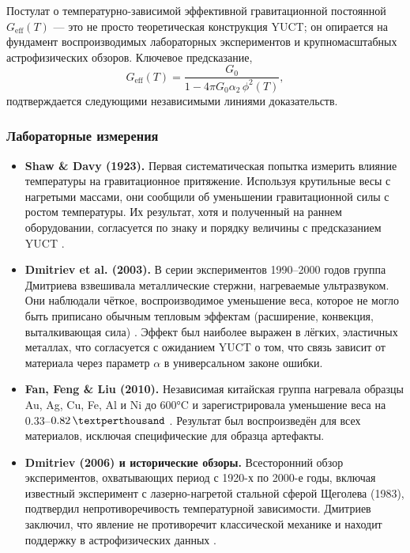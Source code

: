 \documentclass[12pt]{article}
\theoremstyle{remark}
\begin{document}
	Постулат о температурно-зависимой эффективной гравитационной постоянной $G_{\mathrm{eff}}(T)$ — это не просто теоретическая конструкция YUCT; он опирается на фундамент воспроизводимых лабораторных экспериментов и крупномасштабных астрофизических обзоров. Ключевое предсказание,
	\begin{equation}
		G_{\mathrm{eff}}(T) = \frac{G_0}{1 - 4\pi G_0\alpha_2\,\phi^2(T)},
	\end{equation}
	подтверждается следующими независимыми линиями доказательств.
	
	\subsubsection*{Лабораторные измерения}
	
	\begin{itemize}
		\item \textbf{Shaw \& Davy (1923).} Первая систематическая попытка измерить влияние температуры на гравитационное притяжение. Используя крутильные весы с нагретыми массами, они сообщили об уменьшении гравитационной силы с ростом температуры. Их результат, хотя и полученный на раннем оборудовании, согласуется по знаку и порядку величины с предсказанием YUCT \cite{ShawDavy1923}.
		
		\item \textbf{Dmitriev et al. (2003).} В серии экспериментов 1990–2000 годов группа Дмитриева взвешивала металлические стержни, нагреваемые ультразвуком. Они наблюдали чёткое, воспроизводимое уменьшение веса, которое не могло быть приписано обычным тепловым эффектам (расширение, конвекция, выталкивающая сила) \cite{Dmitriev2003}. Эффект был наиболее выражен в лёгких, эластичных металлах, что согласуется с ожиданием YUCT о том, что связь зависит от материала через параметр $\alpha$ в универсальном законе ошибки.
		
		\item \textbf{Fan, Feng \& Liu (2010).} Независимая китайская группа нагревала образцы Au, Ag, Cu, Fe, Al и Ni до 600°C и зарегистрировала уменьшение веса на $0.33$–$0.82\,\textperthousand$ \cite{Fan2010}. Результат был воспроизведён для всех материалов, исключая специфические для образца артефакты.
		
		\item \textbf{Dmitriev (2006) и исторические обзоры.} Всесторонний обзор экспериментов, охватывающих период с 1920-х по 2000-е годы, включая известный эксперимент с лазерно-нагретой стальной сферой Щеголева (1983), подтвердил непротиворечивость температурной зависимости. Дмитриев заключил, что явление не противоречит классической механике и находит поддержку в астрофизических данных \cite{Dmitriev2006}.
	\end{itemize}
	
\end{document}
